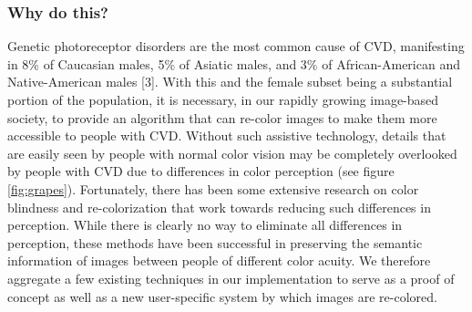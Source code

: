 \documentclass[10pt,twocolumn,letterpaper]{article}
\begin{document}
\subsubsection{Why do this?}
	Genetic photoreceptor disorders are the most common cause of CVD, manifesting in 8\% of Caucasian males, 5\% of Asiatic males, and 3\% of African-American and Native-American males [3]. With this and the female subset being a substantial portion of the population, it is necessary, in our rapidly growing image-based society, to provide an algorithm that can re-color images to make them more accessible to people with CVD. Without such assistive technology, details that are easily seen by people with normal color vision may be completely overlooked by people with CVD due to differences in color perception (see figure \ref{fig:grapes}). Fortunately, there has been some extensive research on color blindness and re-colorization that work towards reducing such differences in perception. While there is clearly no way to eliminate all differences in perception, these methods have been successful in preserving the semantic information of images between people of different color acuity. We therefore aggregate a few existing techniques in our implementation to serve as a proof of concept as well as a new user-specific system by which images are re-colored.
\end{document}
